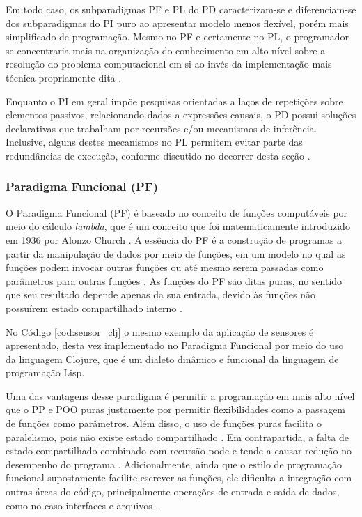 Em todo caso, os subparadigmas PF e PL do PD caracterizam-se e diferenciam-se
dos subparadigmas do PI puro ao apresentar modelo menos flexível, porém mais
simplificado de programação. Mesmo no PF e certamente no PL, o programador se
concentraria mais na organização do conhecimento  em alto nível sobre a
resolução do problema computacional em si ao invés da implementação mais técnica
propriamente dita \cite{doc_ronszcka_2019}.

Enquanto o PI em geral impõe pesquisas orientadas a laços de repetições sobre
elementos passivos, relacionando dados a expressões causais, o PD possui
soluções declarativas que trabalham por recursões e/ou mecanismos de inferência.
Inclusive, alguns destes mecanismos no PL permitem evitar parte das redundâncias de
execução, conforme discutido no decorrer desta seção \cite{doc_ronszcka_2019}. 


\subsubsection{Paradigma Funcional (PF)}

O Paradigma Funcional (PF) é baseado no conceito de funções computáveis por meio
do cálculo \textit{lambda}, que é um conceito que foi matematicamente
introduzido em 1936 por Alonzo Church \cite{henk_1984}. A essência do PF é a
construção de programas a partir da manipulação de dados por meio de funções, em
um modelo no qual as funções podem invocar outras funções ou até mesmo serem
passadas como parâmetros para outras funções
\cite{scott_2000,msc_Banaszewski_2009}. As funções do PF são ditas puras, no
sentido que seu resultado depende apenas da sua entrada, devido às funções não
possuírem estado compartilhado interno \cite{scott_2000}.

No Código \ref{cod:sensor_clj} o mesmo exemplo da aplicação de sensores é
apresentado, desta vez implementado no Paradigma Funcional por meio do uso da
linguagem Clojure, que é um dialeto dinâmico e funcional da linguagem de
programação Lisp.

Uma das vantagens desse paradigma é permitir a programação em mais alto nível
que o PP e POO puras justamente por permitir flexibilidades como a passagem de
funções como parâmetros. Além disso, o uso de funções puras facilita o
paralelismo, pois não existe estado compartilhado
\cite{scott_2000,bhadwal_2020}. Em contrapartida, a falta de estado
compartilhado combinado com recursão pode e tende a causar redução no desempenho
do programa \cite{bhadwal_2020}. Adicionalmente, ainda que o estilo de
programação funcional supostamente facilite escrever as funções, ele dificulta a
integração com outras áreas do código, principalmente operações de entrada e
saída de dados, como no caso interfaces e arquivos \cite{bhadwal_2020}.

